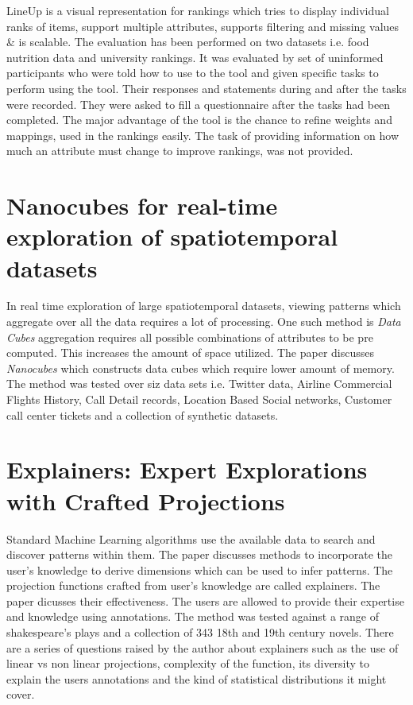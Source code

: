 \documentclass[paper=a4, fontsize=11pt]{scrartcl}
\numberwithin{equation}{section} %
\numberwithin{figure}{section} %
\numberwithin{table}{section} %
\begin{document}
LineUp is a visual representation for rankings which tries to display individual ranks of items, support multiple attributes, supports filtering and missing values \& is scalable. The evaluation has been performed on two datasets i.e. food nutrition data and university rankings. It was evaluated by set of uninformed participants who were told how to use to the tool and given specific tasks to perform using the tool. Their responses and statements during and after the tasks were recorded. They were asked to fill a questionnaire after the tasks had been completed. The major advantage of the tool is the chance to refine weights and mappings, used in the rankings easily. The task of providing information on how much an attribute must change to improve rankings, was not provided.

\section{Nanocubes for real-time exploration of spatiotemporal datasets~\cite{lins2013nanocubes}}
In real time exploration of large spatiotemporal datasets, viewing patterns which aggregate over all the data requires a lot of processing. One such method is \textit{Data Cubes} aggregation requires all possible combinations of attributes to be pre computed. This increases the amount of space utilized.  The paper discusses \textit{Nanocubes} which constructs data cubes which require lower amount of memory. The method was tested over siz data sets i.e. Twitter data, Airline Commercial Flights History, Call Detail records, Location Based Social networks, Customer call center tickets and a collection of synthetic datasets. 

\section{Explainers: Expert Explorations with Crafted Projections~\cite{gleicher2013explainers}}
Standard Machine Learning algorithms use the available data to search and discover patterns within them. The paper discusses methods to incorporate the user's knowledge to derive dimensions which can be used to infer patterns. The projection functions crafted from user's knowledge are called explainers. The paper dicusses their effectiveness. The users are allowed to provide their expertise and knowledge using annotations. The method was tested against a range of shakespeare's plays and a collection of 343 18th and 19th century novels. There are a series of questions raised by the author about explainers such as the use of linear vs non linear projections, complexity of the function, its diversity to explain the users annotations and the kind of statistical distributions it might cover.
\end{document}
